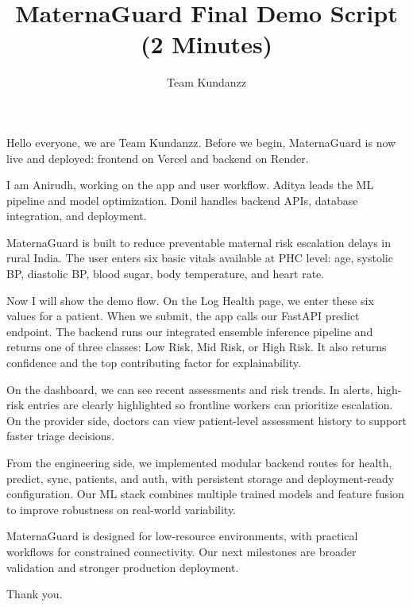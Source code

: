 \documentclass[12pt]{article}
\title{MaternaGuard Final Demo Script (2 Minutes)}
\author{Team Kundanzz}
\date{}
\begin{document}
\maketitle

Hello everyone, we are Team Kundanzz.
Before we begin, MaternaGuard is now live and deployed: frontend on Vercel and backend on Render.

I am Anirudh, working on the app and user workflow.
Aditya leads the ML pipeline and model optimization.
Donil handles backend APIs, database integration, and deployment.

MaternaGuard is built to reduce preventable maternal risk escalation delays in rural India.
The user enters six basic vitals available at PHC level: age, systolic BP, diastolic BP, blood sugar, body temperature, and heart rate.

Now I will show the demo flow.
On the Log Health page, we enter these six values for a patient.
When we submit, the app calls our FastAPI predict endpoint.
The backend runs our integrated ensemble inference pipeline and returns one of three classes: Low Risk, Mid Risk, or High Risk.
It also returns confidence and the top contributing factor for explainability.

On the dashboard, we can see recent assessments and risk trends.
In alerts, high-risk entries are clearly highlighted so frontline workers can prioritize escalation.
On the provider side, doctors can view patient-level assessment history to support faster triage decisions.

From the engineering side, we implemented modular backend routes for health, predict, sync, patients, and auth, with persistent storage and deployment-ready configuration.
Our ML stack combines multiple trained models and feature fusion to improve robustness on real-world variability.

MaternaGuard is designed for low-resource environments, with practical workflows for constrained connectivity.
Our next milestones are broader validation and stronger production deployment.

Thank you.
\end{document}
